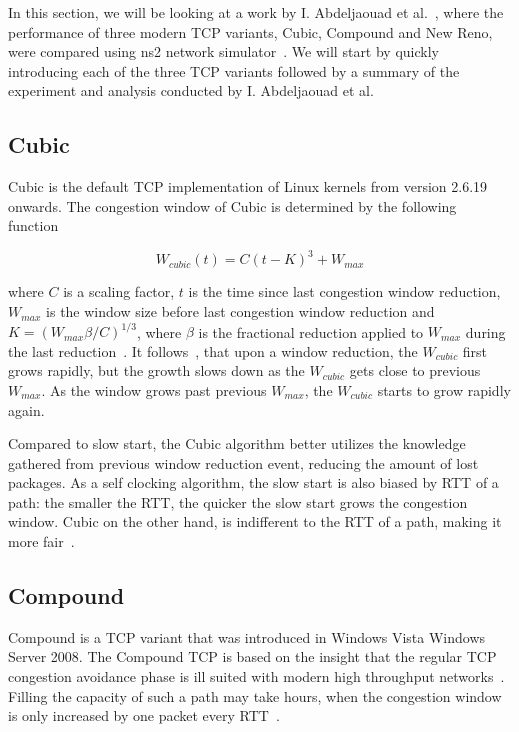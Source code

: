 In this section, we will be looking at a work by I. Abdeljaouad et al.~\cite{Abdeljaouad10}, where the performance of three modern TCP variants, Cubic, Compound and New Reno, were compared using ns2 network simulator~\cite{Singh12}. We will start by quickly introducing each of the three TCP variants followed by a summary of the experiment and analysis conducted by I. Abdeljaouad et al.

\subsection{Cubic}

Cubic is the default TCP implementation of Linux kernels from version 2.6.19 onwards. The congestion window of Cubic is determined by the following function~\cite{Ha08}

\[
W_{cubic}(t) = C(t - K)^3 + W_{max}   
\]

where $C$ is a scaling factor, $t$ is the time since last congestion window reduction, $W_{max}$ is the window size before last congestion window reduction and $K = (W_{max} \beta / C)^{1 / 3}$, where $\beta$ is the fractional reduction applied to $W_{max}$ during the last reduction~\cite{Ha08}. It follows~\cite{Ha08}, that upon a window reduction, the $W_{cubic}$ first grows rapidly, but the growth slows down as the $W_{cubic}$ gets close to previous $W_{max}$. As the window grows past previous $W_{max}$, the $W_{cubic}$ starts to grow rapidly again. 

Compared to slow start, the Cubic algorithm better utilizes the knowledge gathered from previous window reduction event, reducing the amount of lost packages. As a self clocking algorithm, the slow start is also biased by RTT of a path: the smaller the RTT, the quicker the slow start grows the congestion window. Cubic on the other hand, is indifferent to the RTT of a path, making it more fair~\cite{Ha08}. 

\subsection{Compound}

Compound is a TCP variant that was introduced in Windows Vista Windows Server 2008. The Compound TCP is based on the insight that the regular TCP congestion avoidance phase is ill suited with modern high throughput networks~\cite{Tan05}. Filling the capacity of such a path may take hours, when the congestion window is only increased by one packet every RTT~\cite{Tan05}.

